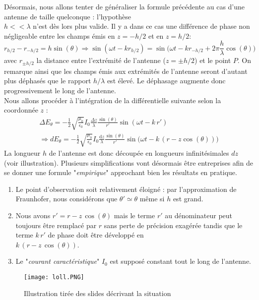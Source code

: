 Désormais, nous allons tenter de généraliser la formule précédente au cas d'une antenne de taille quelconque : l'hypothèse \\$h<<\lambda$ n'est dès lors plus valide. Il y a dans ce cas une différence de phase non négligeable entre les champs émis en $z=-h/2$ et en $z=h/2$:
$$ r_{h/2}-r_{-h/2}=h\sin(\theta)\Rightarrow \sin(\omega t-kr_{h/2})=\sin\bigg(\omega t-kr_{-h/2}+2\pi\frac{h}{\lambda}\cos(\theta)\bigg)$$
avec $r_{\pm h/2}$ la distance entre l'extrémité de l'antenne ($z=\pm h/2$) et le point $P$. On remarque ainsi que les champs émis aux extrémités de l'antenne seront d'autant plus déphasés que le rapport $h/\lambda$ est élevé. Le déphasage augmente donc progressivement le long de l'antenne.\\
Nous allons procéder à l'intégration de la différentielle suivante selon la coordonnée $z$ : \begin{multline*} \Delta E_{\theta} = -\frac{1}{2}\sqrt{\frac{\mu_0}{\epsilon_0}}I_0 \frac{\Delta z}{\lambda}\frac{\sin(\theta)}{r'}\sin(\omega t-k\, r') \\ \Rightarrow dE_{\theta} = -\frac{1}{2}\sqrt{\frac{\mu_0}{\epsilon_0}}I_0 \frac{\textrm{d}z}{\lambda}\frac{\sin(\theta)}{r'}\sin\Big(\omega t-k\, (r-z\cos(\theta))\Big) \end{multline*}
La longueur $h$ de l'antenne est donc découpée en longueurs infinitésimales $dz$ (voir illustration). Plusieurs simplifications vont désormais être entreprises afin de se donner une formule "\textit{empirique}" approchant bien les résultats en pratique. 

\begin{enumerate}
\item Le point d'observation soit relativement éloigné : par l'approximation de Fraunhofer, nous considérons que $\theta ' \simeq \theta$ même si $h$ est grand.
\item Nous avons $r' = r - z\,\cos(\theta)$ mais le terme $r'$ au dénominateur peut toujours être remplacé par $r$ sans perte de précision exagérée tandis que le terme $k\,r'$ de phase doit être développé en\\ $k\,(r - z\,\cos(\theta))$.
\item Le "\textit{courant caractéristique}" $I_0$ est supposé constant tout le long de l'antenne. 
\end{enumerate}

\begin{figure}[h]\centering
\texttt{[image: loll.PNG]}
\caption{Illustration tirée des slides décrivant la situation}
\label{fig:ae2}
\end{figure}

